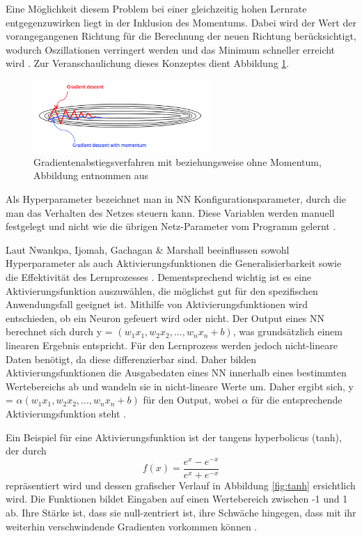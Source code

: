 \documentclass[12pt,a4paper]{article}
\begin{document}
Eine Möglichkeit diesem Problem bei einer gleichzeitig hohen Lernrate entgegenzuwirken liegt in der Inklusion des Momentums. Dabei wird der Wert der vorangegangenen Richtung für die Berechnung der neuen Richtung berücksichtigt, wodurch Oszillationen verringert werden und das Minimum schneller erreicht wird \cite{Rumelhart1985}. Zur Veranschaulichung dieses Konzeptes dient Abbildung \ref{fig:sgd_momentum}.

\begin{figure}
\centering
\includegraphics[width=0.6\textwidth]{pics/sgd_momentum.png}	
\caption{Gradientenabstiegsverfahren mit beziehungsweise ohne Momentum, Abbildung entnommen aus \cite{MediumSGD}}
\label{fig:sgd_momentum}
\end{figure}

Als Hyperparameter bezeichnet man in NN Konfigurationsparameter, durch die man das Verhalten des Netzes steuern kann. Diese Variablen werden manuell festgelegt und nicht wie die übrigen Netz-Parameter vom Programm gelernt \cite[S. 113]{Goodfellow2015}.

Laut Nwankpa, Ijomah, Gachagan \& Marshall beeinflussen sowohl Hyperparameter als auch Aktivierungsfunktionen die Generalisierbarkeit sowie die Effektivität des Lernprozesses \cite{Nwankpa2018}. Dementsprechend wichtig ist es eine Aktivierungsfunktion auszuwählen, die möglichst gut für den spezifischen Anwendungsfall geeignet ist. Mithilfe von Aktivierungsfunktionen wird entschieden, ob ein Neuron gefeuert wird oder nicht. Der Output eines NN berechnet sich durch y = $(w_{1}x_{1}, w_{2}x_{2}, ..., w_{n}x_{n} + b)$, was grundsätzlich einem linearen Ergebnis entspricht. Für den Lernprozess werden jedoch nicht-lineare Daten benötigt, da diese differenzierbar sind. Daher bilden Aktivierungsfunktionen die Ausgabedaten eines NN innerhalb eines bestimmten Wertebereichs ab und wandeln sie in nicht-lineare Werte um. Daher ergibt sich, y = $ \alpha (w_{1}x_{1}, w_{2}x_{2}, ..., w_{n}x_{n} + b)$ für den Output, wobei $\alpha $ für die entsprechende Aktivierungsfunktion steht \cite{Nwankpa2018}.

Ein Beispiel für eine Aktivierungsfunktion ist der tangens hyperbolicus (tanh), der durch 
\begin{equation}
f(x) = \frac{e^x - e^{-x}}{e^x + e^{-x}}
\end{equation}
repräsentiert wird \cite{Nwankpa2018} und dessen grafischer Verlauf in Abbildung \ref{fig:tanh} ersichtlich wird. Die Funktionen bildet Eingaben auf einen Wertebereich zwischen -1 und 1 ab. Ihre Stärke ist, dass sie null-zentriert ist, ihre Schwäche hingegen, dass mit ihr weiterhin verschwindende Gradienten vorkommen können \cite{Nwankpa2018}.
\end{document}
